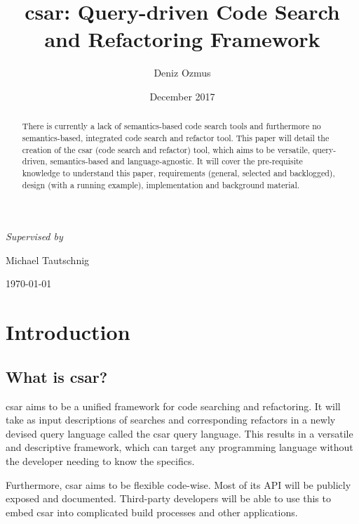 \documentclass[12pt, letterpaper]{article}
\title{csar: Query-driven Code Search and Refactoring Framework}
\author{Deniz Ozmus}
\date{December 2017}
\def \supervisor {Michael Tautschnig}
\begin{document}
\nocite{*}

\begin{titlepage}
    \centering
    {\Large \MyTitle\par}
    \vspace{3cm}
    {\MyAuthor\par}
    \vspace{0.5cm}
    {\itshape Supervised by }{ \supervisor\par}
    \vspace{13cm}
    {\today\par}
\end{titlepage}

\begin{abstract}
    There is currently a lack of semantics-based code search tools and furthermore no semantics-based, integrated code search and refactor tool.
    This paper will detail the creation of the csar (code search and refactor) tool, which aims to be versatile, query-driven, semantics-based and language-agnostic.
    It will cover the pre-requisite knowledge to understand this paper, requirements (general, selected and backlogged), design (with a running example), implementation and background material.
\end{abstract}
\newpage

\tableofcontents
\newpage

\section{Introduction}
\subsection{What is csar?}

csar aims to be a unified framework for code searching and refactoring. It will take as input descriptions of searches and corresponding refactors in a newly devised query language called the csar query language. This results in a versatile and descriptive framework, which can target any programming language without the developer needing to know the specifics.

Furthermore, csar aims to be flexible code-wise. Most of its API will be publicly exposed and documented. Third-party developers will be able to use this to embed csar into complicated build processes and other applications.
\end{document}
